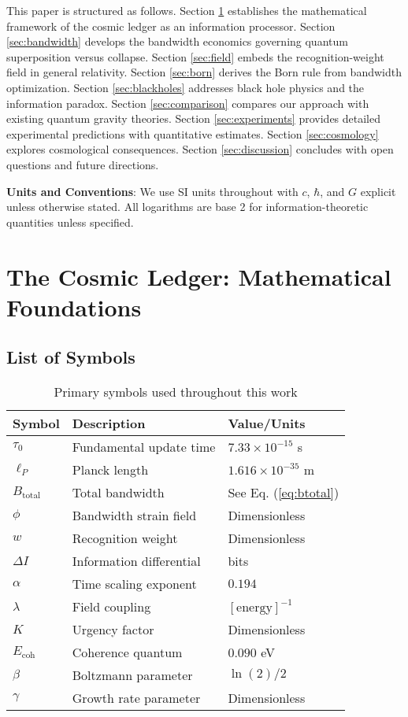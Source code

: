 \documentclass[twocolumn,prd,amsmath,amssymb,aps,superscriptaddress,nofootinbib]{revtex4-2}
\begin{document}
This paper is structured as follows. Section \ref{sec:ledger} establishes the mathematical framework of the cosmic ledger as an information processor. Section \ref{sec:bandwidth} develops the bandwidth economics governing quantum superposition versus collapse. Section \ref{sec:field} embeds the recognition-weight field in general relativity. Section \ref{sec:born} derives the Born rule from bandwidth optimization. Section \ref{sec:blackholes} addresses black hole physics and the information paradox. Section \ref{sec:comparison} compares our approach with existing quantum gravity theories. Section \ref{sec:experiments} provides detailed experimental predictions with quantitative estimates. Section \ref{sec:cosmology} explores cosmological consequences. Section \ref{sec:discussion} concludes with open questions and future directions.

\textbf{Units and Conventions}: We use SI units throughout with $c$, $\hbar$, and $G$ explicit unless otherwise stated. All logarithms are base 2 for information-theoretic quantities unless specified.

\section{The Cosmic Ledger: Mathematical Foundations}
\label{sec:ledger}

\subsection{List of Symbols}

\begin{table}[h]
\caption{Primary symbols used throughout this work}
\label{tab:symbols}
\begin{ruledtabular}
\begin{tabular}{lll}
Symbol & Description & Value/Units \\
\hline
$\tau_0$ & Fundamental update time & $7.33 \times 10^{-15}$ s \\
$\ell_P$ & Planck length & $1.616 \times 10^{-35}$ m \\
$B_{\text{total}}$ & Total bandwidth & See Eq. (\ref{eq:btotal}) \\
$\phi$ & Bandwidth strain field & Dimensionless \\
$w$ & Recognition weight & Dimensionless \\
$\Delta I$ & Information differential & bits \\
$\alpha$ & Time scaling exponent & $0.194$ \\
$\lambda$ & Field coupling & $[\text{energy}]^{-1}$ \\
$K$ & Urgency factor & Dimensionless \\
$E_{\text{coh}}$ & Coherence quantum & $0.090$ eV \\
$\beta$ & Boltzmann parameter & $\ln(2)/2$ \\
$\gamma$ & Growth rate parameter & Dimensionless \\
\end{tabular}
\end{ruledtabular}
\end{table}
\end{document}
